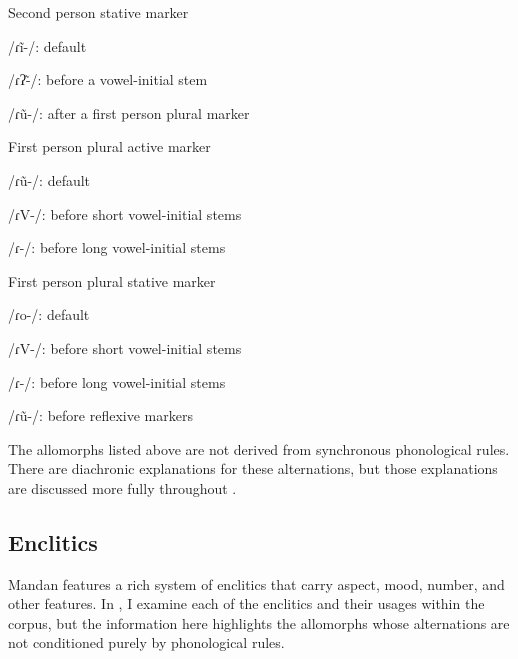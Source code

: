 \begin{exe}
    \item\label{CHSkEx2S} Second person stative marker
        \begin{xlist}
        \item\label{CHSkEx2Sa} /ɾĩ-/: default
        \item\label{CHSkEx2Sb} /ɾʔ\~-/: before a vowel-initial stem
        \item\label{CHSkEx2Sc} /ɾũ-/: after a first person plural marker
        \end{xlist}
    \item\label{CHSk1APl} First person plural active marker
    \begin{xlist}
        \item\label{CHSk1APla} /ɾũ-/: default
        \item\label{CHSk1APlb} /ɾV-/: before short vowel-initial stems
        \item\label{CHSk1APlc} /ɾ-/: before long vowel-initial stems
    \end{xlist}
    \item\label{CHSk1SPl} First person plural stative marker
    \begin{xlist}
        \item\label{CHSk1SPla} /ɾo-/: default
        \item\label{CHSk1SPlb} /ɾV-/: before short vowel-initial stems
        \item\label{CHSk1SPlc} /ɾ-/: before long vowel-initial stems    
        \item\label{CHSk1SPld} /ɾũ-/: before reflexive markers
    \end{xlist}
\end{exe}

The allomorphs listed above are not derived from synchronous phonological rules. There are diachronic explanations for these alternations, but those explanations are discussed more fully throughout .

\subsection{Enclitics}\label{CHSk3.2}

Mandan features a rich system of enclitics that carry aspect, mood, number, and other features. In , I examine each of the enclitics and their usages within the corpus, but the information here highlights the allomorphs whose alternations are not conditioned purely by phonological rules.

